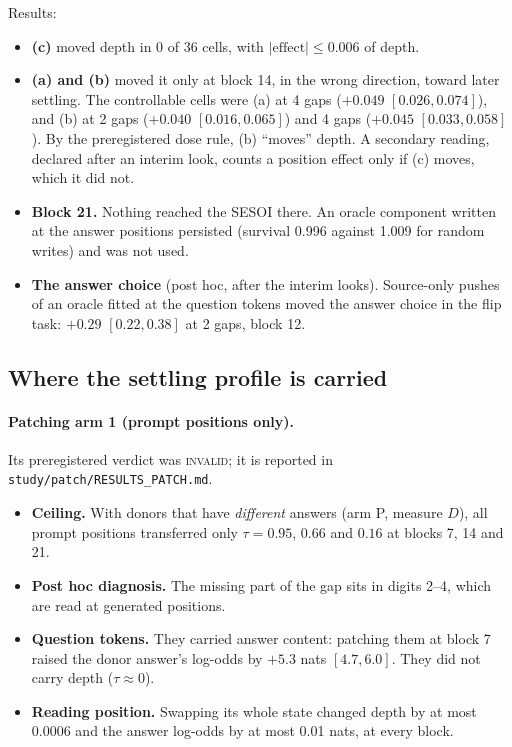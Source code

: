 \documentclass[11pt]{article}
\newcommand{\verdict}[1]{\textsc{\MakeLowercase{#1}}}
\begin{document}
Results:
\begin{itemize}
\item \textbf{(c)} moved depth in 0 of 36 cells, with $|\text{effect}| \le 0.006$ of depth.
\item \textbf{(a) and (b)} moved it only at block 14, in the wrong direction, toward later settling. The controllable cells were (a) at 4 gaps ($+0.049$ $[0.026, 0.074]$), and (b) at 2 gaps ($+0.040$ $[0.016, 0.065]$) and 4 gaps ($+0.045$ $[0.033, 0.058]$). By the preregistered dose rule, (b) ``moves'' depth. A secondary reading, declared after an interim look, counts a position effect only if (c) moves, which it did not.
\item \textbf{Block 21.} Nothing reached the SESOI there. An oracle component written at the answer positions persisted (survival 0.996 against 1.009 for random writes) and was not used.
\item \textbf{The answer choice} (post hoc, after the interim looks). Source-only pushes of an oracle fitted at the question tokens moved the answer choice in the flip task: $+0.29$ $[0.22, 0.38]$ at 2 gaps, block 12.
\end{itemize}

\subsection{Where the settling profile is carried}

\paragraph{Patching arm 1 (prompt positions only).} Its preregistered verdict was \verdict{INVALID}; it is reported in \texttt{study/patch/RESULTS\_PATCH.md}.
\begin{itemize}
\item \textbf{Ceiling.} With donors that have \emph{different} answers (arm P, measure $D$), all prompt positions transferred only $\tau = 0.95$, $0.66$ and $0.16$ at blocks 7, 14 and 21.
\item \textbf{Post hoc diagnosis.} The missing part of the gap sits in digits 2--4, which are read at generated positions.
\item \textbf{Question tokens.} They carried answer content: patching them at block 7 raised the donor answer's log-odds by $+5.3$ nats $[4.7, 6.0]$. They did not carry depth ($\tau \approx 0$).
\item \textbf{Reading position.} Swapping its whole state changed depth by at most 0.0006 and the answer log-odds by at most 0.01 nats, at every block.
\end{itemize}
\end{document}
